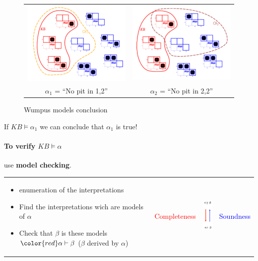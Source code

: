 \begin{figure}[h]
    \centering
    \begin{tabular}{cc}
        \includegraphics[width=6cm]{alpha_1.png}
        &
        \includegraphics[width=6cm]{alpha_2.png}
        \\
        $\alpha_1$ = ``No pit in 1,2''
        &
        $\alpha_2$ = ``No pit in 2,2''
        \\
    \end{tabular}
    \caption{Wumpus models conclusion}
\end{figure}

If $KB \models \alpha_1$ we can conclude that $\alpha_1$ is true!


\paragraph{To verify $KB \models \alpha$} use \textbf{model checking}.\\
\begin{tabular}{m{11cm}m{1cm}m{1.5cm}m{1cm}}
    \begin{itemize}
        \item enumeration of the interpretations
        \item Find the interpretations wich are models of $\alpha$
        \item Check that $\beta$ is these models $\color{red} \alpha \vdash \beta$ ($\beta$ derived by 
        $\alpha$)
    \end{itemize}
    &
    \textcolor{red}{Completeness}
    &
    \includegraphics[width=1cm]{soundness.png}
    &
    \textcolor{blue}{Soundness}
    \\
\end{tabular}


